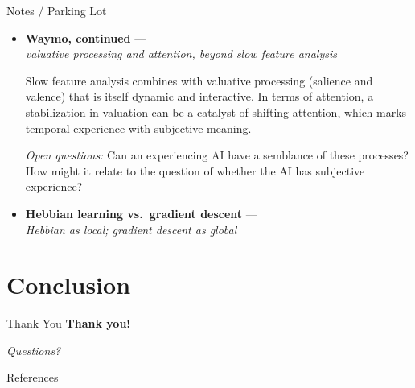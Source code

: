 \documentclass[aspectratio=169]{beamer}
\begin{document}
\begin{frame}[allowframebreaks]{Notes / Parking Lot}
  \footnotesize
  \begin{itemize}
    \item \textbf{Waymo, continued} --- %
      \\ \emph{valuative processing and attention, beyond slow feature analysis}

      \vspace{0.5em}
      Slow feature analysis combines with valuative processing (salience and valence) that is itself dynamic and interactive. In terms of attention, a stabilization in valuation can be a catalyst of shifting attention, which marks temporal experience with subjective meaning.

      \vspace{0.5em}
      \emph{Open questions:} Can an experiencing AI have a semblance of these processes? How might it relate to the question of whether the AI has subjective experience?

    \item \textbf{Hebbian learning vs.\ gradient descent} --- %
      \\ \emph{Hebbian as local; gradient descent as global}
  \end{itemize}
\end{frame}

\section{Conclusion}

\begin{frame}{Thank You}
  \centering
  \textbf{Thank you!}

  \vspace{0.5em}

  \textit{Questions?}
\end{frame}


\begin{frame}[allowframebreaks]{References}
  \printbibliography
\end{frame}
\end{document}
